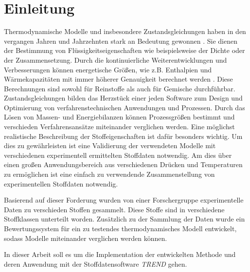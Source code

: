 \documentclass[../thesis.tex]{subfiles}
\begin{document}
\chapter{Einleitung}
\label{chp:Motivation}
Thermodynamische Modelle und insbesondere Zustandsgleichungen haben in den vergangen Jahren und Jahrzehnten stark an Bedeutung gewonnen \cite{ahlers2002development} \cite{stacey2000k}. Sie dienen der Bestimmung von Flüssigkeitseigenschaften wie beispielsweise der Dichte oder der Zusammensetzung. Durch die kontinuierliche Weiterentwicklungen und Verbesserungen können energetische Größen, wie z.B. Enthalpien und Wärmekapazitäten mit immer höherer Genauigkeit berechnet werden \cite{chen2002modification}. Diese Berechnungen sind sowohl für Reinstoffe als auch für Gemische durchführbar.
Zustandsgleichungen bilden das Herzstück einer jeden Software zum Design und Optimierung von verfahrenstechnischen Anwendungen und Prozessen. Durch das Lösen von Massen- und Energiebilanzen können Prozessgrößen bestimmt und verschieden Verfahrensansätze miteinander verglichen werden. Eine möglichst realistische Beschreibung der Stoffeigenschaften ist dafür besonders wichtig. Um dies zu gewährleisten ist eine Validierung der verwendeten Modelle mit verschiedenen experimentell ermittelten Stoffdaten notwendig. Am dies über einen großen Anwendungsbereich aus verschiedenen Drücken und Temperaturen zu ermöglichen ist eine einfach zu verwendende Zusammenstellung von experimentellen Stoffdaten notwendig.

Basierend auf dieser Forderung wurden von einer Forschergruppe experimentelle Daten zu verschieden Stoffen gesammelt. Diese Stoffe sind in verschiedene Stoffklassen unterteilt worden. Zusätzlich zu der Sammlung der Daten wurde ein Bewertungssystem für ein zu testendes thermodynamisches Modell entwickelt, sodass Modelle miteinander verglichen werden können. \cite{jaubert2020benchmark}

In dieser Arbeit soll es um die Implementation der entwickelten Methode und deren Anwendung mit der Stoffdatensoftware \textit{TREND} gehen.
\end{document}
